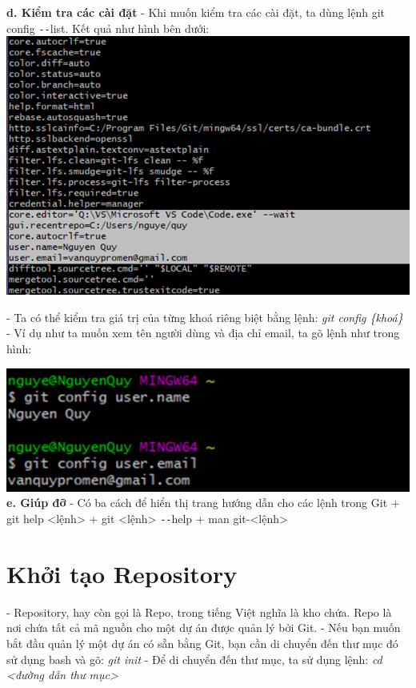 \documentclass[12pt,a4paper]{report}
\begin{document}
	\label{fig:screenshot002}
\vskip 0.4cm \vskip 0.4cm
{\bf d. Kiểm tra các cài đặt} \vskip 0.4cm
- Khi muốn kiểm tra các cài đặt, ta dùng lệnh git config \texttt{-{}-}list. Kết quả như hình bên dưới: 
\vskip 0.4cm
	\includegraphics[width=0.8\linewidth]{screenshot003}
	\label{fig:screenshot003}\vskip 0.4cm\vskip 0.4cm

- Ta có thể kiểm tra giá trị của từng khoá riêng biệt bằng lệnh: {\it git config \{khoá\}}\vskip 0.4cm
- Ví dụ như ta muốn xem tên người dùng và địa chỉ email, ta gõ lệnh như trong hình: \vskip 0.4cm

	\includegraphics[width=0.8\linewidth]{screenshot004}
	\label{fig:screenshot004}
 \vskip 0.4cm\vskip 0.4cm
{\bf e. Giúp đỡ} \vskip 0.4cm
 - Có ba cách để hiển thị trang hướng dẫn cho các lệnh trong Git \vskip 0.4cm
 + git help <lệnh> \vskip 0.4cm
 + git <lệnh> \texttt{-{}-}help \vskip 0.4cm
 + man git-<lệnh>  \vskip 0.4cm
 




\section{Khởi tạo Repository}
\hspace{0.6cm}{\bf a. Khởi tạo một repository trong một thư mục có sẵn} \vskip 0.4cm
- Repository, hay còn gọi là Repo, trong tiếng Việt nghĩa là kho chứa. Repo là nơi chứa tất cả mã nguồn cho một dự án được quản lý bởi Git.\vskip 0.4cm
- Nếu bạn muốn bắt đầu quản lý một dự án có sẵn bằng Git, bạn cần di chuyển đến thư mục đó sử dụng bash và gõ: \textit{git init}\vskip 0.4cm
- Để di chuyển đến thư mục, ta sử dụng lệnh: {\it cd <đường dẫn thư mục> }\vskip 0.4cm
\end{document}
